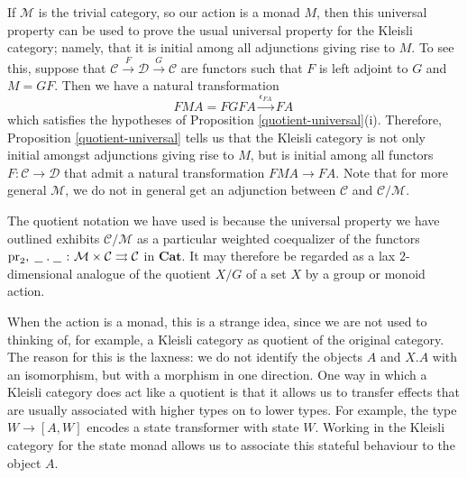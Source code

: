 \documentclass{svproc}
\newcommand\C{\mathcal{C}}
\newcommand\D{\mathcal{D}}
\newcommand\M{\mathcal{M}}
\DeclareMathOperator\pr{pr}
\newcommand*\from{\colon}
\newcommand{\0}{{\mathtt{0}}} \newcommand{\com}{{\mathtt{com}}}
\newcommand{\blank}{\;\underline{\hspace{1.5ex}}\;}
\newcommand{\catname}[1]{\mathbf{#1}}
\newcommand{\Cat}{\catname{Cat}}
\begin{document}
\begin{remark}
  If $\M$ is the trivial category, so our action is a monad $M$, then this universal property can be used to prove the usual universal property for the Kleisli category; namely, that it is initial among all adjunctions giving rise to $M$.  
  To see this, suppose that $\C \xrightarrow{F} \D \xrightarrow{G} \C$ are functors such that $F$ is left adjoint to $G$ and $M=GF$.  
  Then we have a natural transformation
  \[
    FMA = FGF A \xrightarrow{\epsilon_{F A}} F A\,
    \]
  which satisfies the hypotheses of Proposition \ref{quotient-universal}(i).  
  Therefore, Proposition \ref{quotient-universal} tells us that the Kleisli category is not only initial amongst adjunctions giving rise to $M$, but is initial among all functors $F\from \C \to \D$ that admit a natural transformation $FMA \to FA$.
  Note that for more general $\M$, we do not in general get an adjunction between $\C$ and $\C/\M$.

  The quotient notation we have used is because the universal property we have outlined exhibits $\C/\M$ as a particular weighted coequalizer of the functors $\pr_2,\blank.\blank\from \M\times\C \rightrightarrows \C$ in $\Cat$.
  It may therefore be regarded as a lax $2$-dimensional analogue of the quotient $X/G$ of a set $X$ by a group or monoid action.  
  
  When the action is a monad, this is a strange idea, since we are not used to thinking of, for example, a Kleisli category as quotient of the original category.  
  The reason for this is the laxness: we do not identify the objects $A$ and $X.A$ with an isomorphism, but with a morphism in one direction.  
  One way in which a Kleisli category does act like a quotient is that it allows us to transfer effects that are usually associated with higher types on to lower types.  
  For example, the type $W\to [A,W]$ encodes a state transformer with state $W$.  
  Working in the Kleisli category for the state monad allows us to associate this stateful behaviour to the object $A$.
\end{remark}
\end{document}
